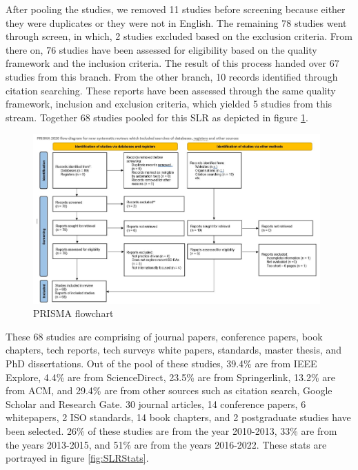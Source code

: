 \documentclass[review]{elsarticle}
\begin{document}
After pooling the studies, we removed 11 studies before screening because either they were duplicates or they were not in English. The remaining 78 studies went through screen, in which, 2 studies excluded based on the exclusion criteria. From there on, 76 studies have been assessed for eligibility based on the quality framework and the inclusion criteria. The result of this process handed over 67 studies from this branch. From the other branch, 10 records identified through citation searching. These reports have been assessed through the same quality framework, inclusion and exclusion criteria, which yielded 5 studies from this stream. Together 68 studies pooled for this SLR as depicted in figure \ref{fig:PRISMA}.

\begin{figure}[h!]
    \centering
    \includegraphics[width=11cm]{PRISMA.JPG}
    \caption{PRISMA flowchart}
    \label{fig:PRISMA}
\end{figure}


These 68 studies are comprising of journal papers, conference papers, book chapters, tech reports, tech surveys white papers, standards, master thesis, and PhD dissertations. Out of the pool of these studies, 39.4\% are from IEEE Explore, 4.4\% are from ScienceDirect, 23.5\% are from Springerlink, 13.2\% are from ACM, and 29.4\% are from other sources such as citation search, Google Scholar and Research Gate. 30 journal articles, 14 conference papers, 6 whitepapers, 2 ISO standards, 14 book chapters, and 2 postgraduate studies have been selected. 26\% of these studies are from the year 2010-2013, 33\% are from the years 2013-2015, and 51\% are from the years 2016-2022. These stats are portrayed in figure \ref{fig:SLRStats}.
\end{document}
